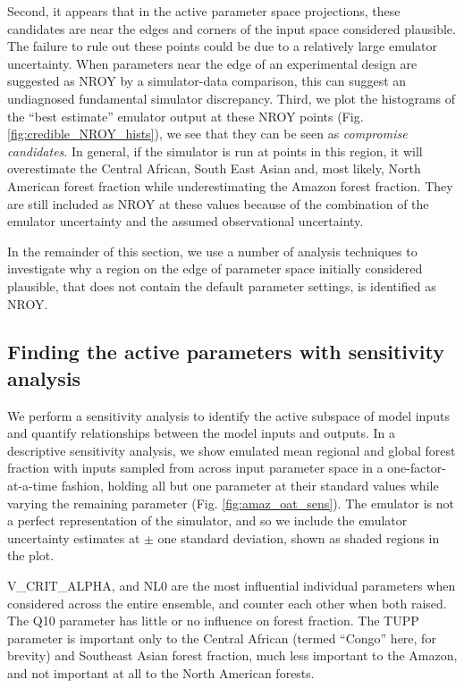 \documentclass[esd, article]{copernicus} %
\begin{document}
Second, it appears that in the active parameter space projections, these candidates are near the edges and corners of the input space considered plausible. The failure to rule out these points could be due to a relatively large emulator uncertainty. When parameters near the edge of an experimental design are suggested as NROY by a simulator-data comparison, this can suggest an undiagnosed fundamental simulator discrepancy. Third, we plot the histograms of the ``best estimate'' emulator output at these NROY points (Fig.  \ref{fig:credible_NROY_hists}), we see that they can be seen as \emph{compromise candidates}. In general, if the simulator is run at points in this region, it will overestimate the Central African, South East Asian and, most likely, North American forest fraction while underestimating the Amazon forest fraction. They are still included as NROY at these values because of the combination of the emulator uncertainty and the assumed observational uncertainty.


In the remainder of this section, we use a number of analysis techniques to investigate why a region on the edge of parameter space initially considered plausible, that does not contain the default parameter settings, is identified as NROY.

\subsection{Finding the active parameters with sensitivity analysis}\label{ssec:sensitivity}

We perform a sensitivity analysis to identify the active subspace of model inputs and quantify relationships between the model inputs and outputs. In a descriptive sensitivity analysis, we show emulated mean regional and global forest fraction with inputs sampled from across input parameter space in a one-factor-at-a-time fashion, holding all but one parameter at their standard values while varying the remaining parameter (Fig.  \ref{fig:amaz_oat_sens}). The emulator is not a perfect representation of the simulator, and so we include the emulator uncertainty estimates at $\pm$ one standard deviation, shown as shaded regions in the plot.

V\_CRIT\_ALPHA, and NL0 are the most influential individual parameters when considered across the entire ensemble, and counter each other when both raised. The Q10 parameter has little or no influence on forest fraction. The TUPP parameter is important only to the Central African (termed ``Congo'' here, for brevity) and Southeast Asian forest fraction, much less important to the Amazon, and not important at all to the North American forests. 
\end{document}

